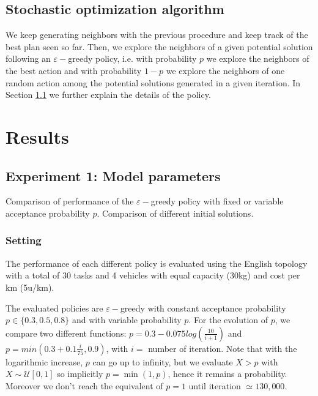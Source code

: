 \documentclass[11pt]{article}
\begin{document}
\subsection{Stochastic optimization algorithm}
We keep generating neighbors with the previous procedure and keep track of the best plan seen so far. Then, we explore the neighbors of a given potential solution following an $\varepsilon-$greedy policy, i.e. with probability $p$ we explore the neighbors of the best action and with probability $1-p$ we explore the neighbors of one random action among the potential solutions generated in a given iteration. In Section \ref{sec:experiment1} we further explain the details of the policy.

\section{Results}

\subsection{Experiment 1: Model parameters} \label{sec:experiment1}
Comparison of performance of the $\varepsilon-$greedy policy with fixed or variable acceptance probability $p$. Comparison of different initial solutions. 

\subsubsection{Setting}
The performance of each different policy is evaluated using the English topology with a total of 30 tasks and 4 vehicles with equal capacity (30kg) and cost per km (5u/km). 

The evaluated policies are $\varepsilon-$greedy with constant acceptance probability $p \in \{ 0.3, 0.5, 0.8\}$ and with variable probability $p$. For the evolution of $p$, we compare two different functions: 
$ p = 0.3 - 0.075 log(\frac{10}{i+1})$ and $ p = min(0.3+0.1 \frac{i}{75}, 0.9)$, with $i = $ number of iteration. Note that with the logarithmic increase, $p$ can go up to infinity, but we evaluate $X>p$ with $X\sim \mathcal{U}[0,1]$ so implicitly $p=\min(1,p)$, hence it remains a probability. Moreover we don't reach the equivalent of $p=1$ until iteration $\simeq130,000$.
\end{document}
